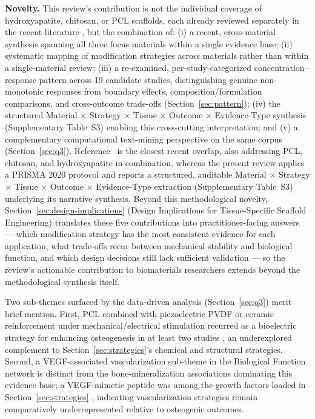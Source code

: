 \documentclass[5p,times,twocolumn]{elsarticle}
\begin{document}
\textbf{Novelty.} This review's contribution is not the individual coverage of hydroxyapatite, chitosan, or PCL scaffolds, each already reviewed separately in the recent literature \cite{ref80,ref81,ref82}, but the combination of: (i) a recent, cross-material synthesis spanning all three focus materials within a single evidence base; (ii) systematic mapping of modification strategies across materials rather than within a single-material review; (iii) a re-examined, per-study-categorized concentration--response pattern across 19 candidate studies, distinguishing genuine non-monotonic responses from boundary effects, composition/formulation comparisons, and cross-outcome trade-offs (Section~\ref{sec:pattern}); (iv) the structured Material $\times$ Strategy $\times$ Tissue $\times$ Outcome $\times$ Evidence-Type synthesis (Supplementary Table~S3) enabling this cross-cutting interpretation; and (v) a complementary computational text-mining perspective on the same corpus (Section~\ref{sec:q3}). Reference~\cite{ref83} is the closest recent overlap, also addressing PCL, chitosan, and hydroxyapatite in combination, whereas the present review applies a PRISMA 2020 protocol and reports a structured, auditable Material $\times$ Strategy $\times$ Tissue $\times$ Outcome $\times$ Evidence-Type extraction (Supplementary Table~S3) underlying its narrative synthesis. Beyond this methodological novelty, Section~\ref{sec:design-implications} (Design Implications for Tissue-Specific Scaffold Engineering) translates these five contributions into practitioner-facing answers --- which modification strategy has the most consistent evidence for each application, what trade-offs recur between mechanical stability and biological function, and which design decisions still lack sufficient validation --- so the review's actionable contribution to biomaterials researchers extends beyond the methodological synthesis itself.

Two sub-themes surfaced by the data-driven analysis (Section~\ref{sec:q3}) merit brief mention. First, PCL combined with piezoelectric PVDF or ceramic reinforcement under mechanical/electrical stimulation recurred as a bioelectric strategy for enhancing osteogenesis in at least two studies \cite{ref21,ref38}, an underexplored complement to Section~\ref{sec:strategies}'s chemical and structural strategies. Second, a VEGF-associated vascularization sub-theme in the Biological Function network is distinct from the bone-mineralization associations dominating this evidence base; a VEGF-mimetic peptide was among the growth factors loaded in Section~\ref{sec:strategies} \cite{ref77}, indicating vascularization strategies remain comparatively underrepresented relative to osteogenic outcomes.
\end{document}
